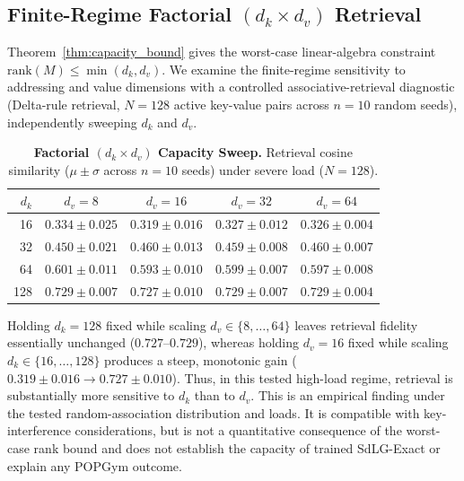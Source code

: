 \subsection{Finite-Regime Factorial \texorpdfstring{$(d_k \times d_v)$}{(dk x dv)} Retrieval}
\label{sec:factorial_dkdv}
\label{app:associative_probe}


Theorem~\ref{thm:capacity_bound} gives the worst-case linear-algebra constraint
$\mathrm{rank}(M) \le \min(d_k, d_v)$. We examine the finite-regime sensitivity
to addressing and value dimensions
with a controlled associative-retrieval diagnostic (Delta-rule retrieval, $N=128$ active
key-value pairs across $n=10$ random seeds), independently sweeping $d_k$ and $d_v$.

\begin{table}[h]
\centering
\small
\caption{\textbf{Factorial $(d_k \times d_v)$ Capacity Sweep.} Retrieval
cosine similarity ($\mu \pm \sigma$ across $n=10$ seeds) under severe load ($N=128$).}
\label{tab:factorial_dkdv}
\begin{tabularx}{\columnwidth}{r c c c c}
\toprule
\textbf{$d_k$} & \textbf{$d_v{=}8$} & \textbf{$d_v{=}16$} & \textbf{$d_v{=}32$} & \textbf{$d_v{=}64$} \\
\midrule
16  & $0.334 \pm 0.025$ & $0.319 \pm 0.016$ & $0.327 \pm 0.012$ & $0.326 \pm 0.004$ \\
32  & $0.450 \pm 0.021$ & $0.460 \pm 0.013$ & $0.459 \pm 0.008$ & $0.460 \pm 0.007$ \\
64  & $0.601 \pm 0.011$ & $0.593 \pm 0.010$ & $0.599 \pm 0.007$ & $0.597 \pm 0.008$ \\
128 & $\mathbf{0.729 \pm 0.007}$ & $\mathbf{0.727 \pm 0.010}$ & $\mathbf{0.729 \pm 0.007}$ & $\mathbf{0.729 \pm 0.004}$ \\
\bottomrule
\end{tabularx}
\end{table}

Holding $d_k=128$ fixed while scaling $d_v \in \{8,\dots,64\}$ leaves
retrieval fidelity essentially unchanged ($0.727\text{--}0.729$), whereas holding
$d_v=16$ fixed while scaling $d_k \in \{16,\dots,128\}$ produces a steep,
monotonic gain ($0.319 \pm 0.016 \to 0.727 \pm 0.010$). Thus, in this tested
high-load regime, retrieval is substantially more sensitive to $d_k$ than to
$d_v$. This is an empirical finding under the tested random-association
distribution and loads. It is compatible with key-interference considerations,
but is not a quantitative consequence of the worst-case rank bound and does not
establish the capacity of trained SdLG-Exact or explain any POPGym outcome.

